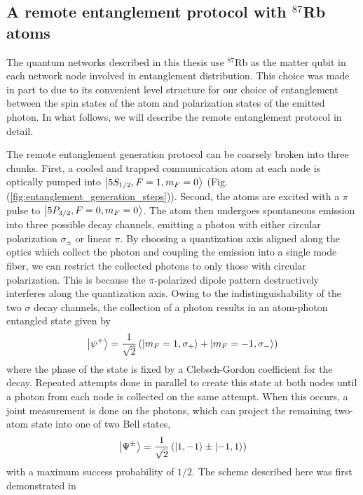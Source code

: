 \subsection{A remote entanglement protocol with $^{87}$Rb atoms}

The quantum networks described in this thesis use $^{87}$Rb as the matter qubit in each network node involved in entanglement distribution. This choice was made in part to due to its convenient level structure for our choice of entanglement between the spin states of the atom and polarization states of the emitted photon. In what follows, we will describe the remote entanglement protocol in detail.

The remote entanglement generation protocol can be coarsely broken into three chunks. First, a cooled and trapped communication atom at each node is optically pumped into $\ket{5S_{1/2},F=1,m_F=0}$ (Fig. (\ref{fig:entanglement_generation_steps})). Second, the atoms are excited with a $\pi$ pulse to $\ket{5P_{3/2},F=0,m_F=0}$. The atom then undergoes spontaneous emission into three possible decay channels, emitting a photon with either circular polarization $\sigma_{\pm}$ or linear $\pi$. By choosing a quantization axis aligned along the optics which collect the photon and coupling the emission into a single mode fiber, we can restrict the collected photons to only those with circular polarization. This is because the $\pi$-polarized dipole pattern destructively interferes along the quantization axis. Owing to the indistinguishability of the two $\sigma$ decay channels, the collection of a photon results in an atom-photon entangled state given by
\begin{equation}\label{eq:atomphotonstates}
    \ket{\psi^+}=\frac{1}{\sqrt{2}}\left(\ket{m_F=1, \sigma_+}+\ket{m_F=-1,\sigma_-}\right)
\end{equation}
where the phase of the state is fixed by a Clebsch-Gordon coefficient for the decay. Repeated attempts done in parallel to create this state at both nodes until a photon from each node is collected on the same attempt. When this occurs, a joint measurement is done on the photons, which can project the remaining two-atom state into one of two Bell states,
\begin{equation}\label{eq:atomatomstates}
    \ket{\Psi^{\pm}} =\frac{1}{\sqrt{2}}\left(\ket{1,-1}\pm\ket{-1,1}\right)
\end{equation}
with a maximum success probability of $1/2$. The scheme described here was first demonstrated in \cite{Hofmann2012}

